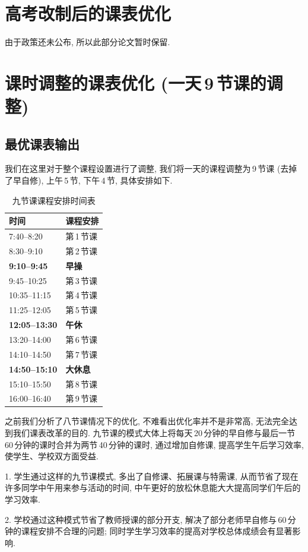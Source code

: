 \documentclass[a4paper]{article}
\begin{document}
\section{高考改制后的课表优化}
 由于政策还未公布, 所以此部分论文暂时保留.
\clearpage
\section{课时调整的课表优化 (一天\,9\,节课的调整)}
 \subsection{最优课表输出}
  我们在这里对于整个课程设置进行了调整, 我们将一天的课程调整为\,9\,节课 (去掉了早自修), 上午\,5\,节, 下午\,4\,节, 具体安排如下.
  \begin{table}[H]
  \centering
  \begin{tabular}{|l|l|}
  \hline
  \bf 时间 & \bf 课程安排 \\\hline
  7:40--8:20 & 第\,1\,节课 \\\hline
  8:30--9:10 & 第\,2\,节课 \\\hline
  \bf 9:10--9:45 & \bf 早操 \\\hline
  9:45--10:25 & 第\,3\,节课 \\\hline
  10:35--11:15 & 第\,4\,节课 \\\hline
  11:25--12:05 & 第\,5\,节课 \\\hline
  \bf 12:05--13:30 & \bf 午休 \\\hline
  13:20--14:00 & 第\,6\,节课 \\\hline
  14:10--14:50 & 第\,7\,节课 \\\hline
  \bf 14:50--15:10 & \bf 大休息 \\\hline
  15:10--15:50 & 第\,8\,节课 \\\hline
  16:00--16:40 & 第\,9\,节课 \\\hline
  \end{tabular}
  \caption{九节课课程安排时间表}
  \end{table}
  之前我们分析了八节课情况下的优化, 不难看出优化率并不是非常高, 无法完全达到我们课表改革的目的. 九节课的模式大体上将每天\,20\,分钟的早自修与最后一节\,60\,分钟的课时合并为两节\,40\,分钟的课时, 通过增加自修课, 提高学生午后学习效率, 使学生、学校双方面受益.\par
  1. 学生通过这样的九节课模式, 多出了自修课、拓展课与特需课, 从而节省了现在许多同学中午用来参与活动的时间, 中午更好的放松休息能大大提高同学们午后的学习效率.\par
  2. 学校通过这种模式节省了教师授课的部分开支, 解决了部分老师早自修与\,60\,分钟的课程安排不合理的问题; 同时学生学习效率的提高对学校总体成绩会有显著影响.\par
\end{document}
